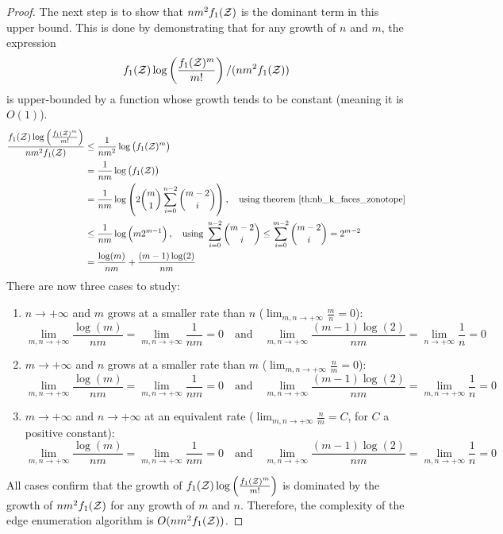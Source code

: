 \begin{proof}
    The next step is to show that $nm^2f_1(\mathcal{Z})$ is the dominant term in this upper bound. This is done by demonstrating that for any growth of $n$ and $m$, the expression 
    $$f_1(\mathcal{Z})\log\left(\frac{f_1(\mathcal{Z})^m}{m!}\right) / (nm^2f_1(\mathcal{Z}))$$
    is upper-bounded by a function whose growth tends to be constant (meaning it is $O(1)$).
    \begin{align*}
        \frac{f_1(\mathcal{Z})\log\left(\frac{f_1(\mathcal{Z})^m}{m!}\right)}{nm^2f_1(\mathcal{Z})} 
        &\leq \frac{1}{nm^2}\log\left(f_1(\mathcal{Z})^m\right) \\
        &= \frac{1}{nm}\log\left(f_1(\mathcal{Z})\right) \\
        &= \frac{1}{nm} \log\left(2\binom{m}{1}\sum_{i=0}^{n-2}\binom{m-2}{i}\right),\quad \text{using theorem \ref{th:nb_k_faces_zonotope}} \\
        &\leq \frac{1}{nm} \log\left(m2^{m-1}\right),\quad \text{using } \sum_{i=0}^{n-2}\binom{m-2}{i} \leq \sum_{i=0}^{m-2}\binom{m-2}{i} = 2^{m-2}  \\
        &= \frac{ \log(m)}{nm} + \frac{ (m-1)\log(2)}{nm} \\
    \end{align*}
    There are now three cases to study:
    \begin{enumerate}[noitemsep]
        \item {$n \rightarrow +\infty$ and $m$ grows at a smaller rate than $n$ ($\lim_{m,n\to +\infty}\frac{m}{n} = 0$): 
        $$\lim_{m,n\to +\infty}\frac{ \log(m)}{nm} = \lim_{m,n\to +\infty}\frac{1}{nm}  = 0\quad \text{and} \quad \lim_{m,n\to +\infty} \frac{ (m-1)\log(2)}{nm} = \lim_{n\to +\infty}\frac{1}{n}  =  0$$
        }
        \item  {$m \rightarrow +\infty$ and $n$ grows at a smaller rate than $m$ ($\lim_{m,n\to +\infty}\frac{n}{m} = 0$): 
        $$\lim_{m,n\to +\infty}\frac{ \log(m)}{nm} = \lim_{m,n\to +\infty}\frac{1}{nm}  = 0\quad \text{and} \quad \lim_{m,n\to +\infty} \frac{ (m-1)\log(2)}{nm} = \lim_{m,n\to +\infty}\frac{1}{n}  =  0$$
         }
         \item  {$m \rightarrow +\infty$ and $n \rightarrow +\infty$ at an equivalent rate ($\lim_{m,n\to +\infty}\frac{n}{m} = C$, for $C$ a positive constant): 
         $$\lim_{m,n\to +\infty}\frac{ \log(m)}{nm} = \lim_{m,n\to +\infty}\frac{1}{nm}  = 0\quad \text{and} \quad \lim_{m,n\to +\infty} \frac{ (m-1)\log(2)}{nm} = \lim_{m,n\to +\infty}\frac{1}{n}  =  0$$
          }
    \end{enumerate}
    All cases confirm that the growth of $f_1(\mathcal{Z})\log\left(\frac{f_1(\mathcal{Z})^m}{m!}\right)$ is dominated by the growth of  $nm^2f_1(\mathcal{Z})$ for any growth of $m$ and $n$. Therefore, the complexity of the edge enumeration algorithm is $O(nm^2f_1(\mathcal{Z}))$.
\end{proof}

